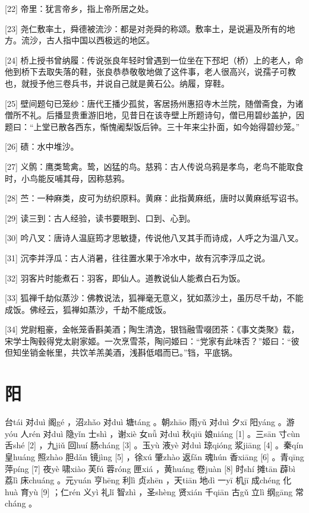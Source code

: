 \documentclass[12pt,UTF8]{ctexbook}
\begin{document}
[22] 帝里：犹言帝乡，指上帝所居之处。

[23] 尧仁敷率土，舜德被流沙：都是对尧舜的称颂。敷率土，是说遍及所有的地方。流沙，古人指中国以西极远的地区。

[24] 桥上授书曾纳履：传说张良年轻时曾遇到一位坐在下邳圯（桥）上的老人，命他到桥下去取失落的鞋，张良恭恭敬敬地做了这件事，老人很高兴，说孺子可教也，就授予他三卷兵书，并说自己就是黄石公。纳履，穿鞋。

[25] 壁间题句已笼纱：唐代王播少孤贫，客居扬州惠招寺木兰院，随僧斋食，为诸僧所不礼。后播显贵重游旧地，见昔日在该寺壁上所题诗句，僧已用碧纱盖护，因题曰：“上堂已散各西东，惭愧阇梨饭后钟。三十年来尘扑面，如今始得碧纱笼。”

[26] 碛：水中堆沙。

[27] 义鹘：鹰类鸷禽。鸷，凶猛的鸟。慈鸦：古人传说乌鸦是孝鸟，老鸟不能取食时，小鸟能反哺其母，因称慈鸦。

[28] 苎：一种麻类，皮可为纺织原料。黄麻：此指黄麻纸，唐时以黄麻纸写诏书。

[29] 读三到：古人经验，读书要眼到、口到、心到。

[30] 吟八叉：唐诗人温庭筠才思敏捷，传说他八叉其手而诗成，人呼之为温八叉。

[31] 沉李并浮瓜：古人消暑，往往置水果于冷水中，故有沉李浮瓜之说。

[32] 羽客片时能煮石：羽客，即仙人。道教说仙人能煮白石为饭。

[33] 狐禅千劫似蒸沙：佛教说法，狐禅毫无意义，犹如蒸沙土，虽历尽千劫，不能成饭。佛经云，狐禅如蒸沙，千劫不能成饭。

[34] 党尉粗豪，金帐笼香斟美酒；陶生清逸，银铛融雪啜团茶：《事文类聚》载，宋学士陶毂得党太尉家姬。一次烹雪茶，陶问姬曰：“党家有此味否？”姬曰：“彼但知坐销金帐里，共饮羊羔美酒，浅斟低唱而已。”铛，平底锅。





\chapter{阳}


台tái 对duì 阁gé ，沼zhǎo 对duì 塘táng 。朝zhāo 雨yǔ 对duì 夕xī 阳yáng 。游yóu 人rén 对duì 隐yǐn 士shì ，谢xiè 女nǚ 对duì 秋qiū 娘niáng [1] 。三sān 寸cùn 舌shé [2] ，九jiǔ 回huí 肠cháng [3] 。玉yù 液yè 对duì 琼qióng 浆jiāng [4] 。秦qín 皇huáng 照zhào 胆dǎn 镜jìng [5] ，徐xú 肇zhào 返fǎn 魂hún 香xiāng [6] 。青qīng 萍píng [7] 夜yè 啸xiào 芙fú 蓉róng 匣xiá ，黄huáng 卷juàn [8] 时shí 摊tān 薜bì 荔lì 床chuáng 。元yuán 亨hēng 利lì 贞zhēn ，天tiān 地dì 一yī 机jī 成chéng 化huà 育yù [9] ；仁rén 义yì 礼lǐ 智zhì ，圣shèng 贤xián 千qiān 古gǔ 立lì 纲gāng 常cháng 。
\end{document}
